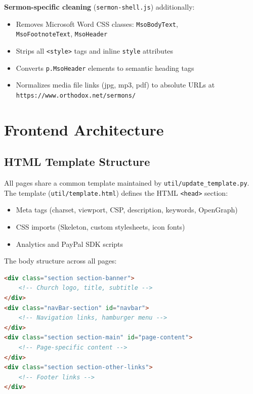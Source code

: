 \documentclass[12pt]{article}
\begin{document}
\textbf{Sermon-specific cleaning} (\texttt{sermon-shell.js}) additionally:
\begin{itemize}
    \item Removes Microsoft Word CSS classes: \texttt{MsoBodyText},\\ \texttt{MsoFootnoteText}, \texttt{MsoHeader}
    \item Strips all \texttt{<style>} tags and inline \texttt{style} attributes
    \item Converts \texttt{p.MsoHeader} elements to semantic heading tags
    \item Normalizes media file links (jpg, mp3, pdf) to absolute URLs at\\ \texttt{https://www.orthodox.net/sermons/}
\end{itemize}

\section{Frontend Architecture}

\subsection{HTML Template Structure}

All pages share a common template maintained by \texttt{util/update\_template.py}. The template (\texttt{util/template.html}) defines the HTML \texttt{<head>} section:

\begin{itemize}
    \item Meta tags (charset, viewport, CSP, description, keywords, OpenGraph)
    \item CSS imports (Skeleton, custom stylesheets, icon fonts)
    \item Analytics and PayPal SDK scripts
\end{itemize}

The body structure across all pages:

\begin{lstlisting}[language=HTML,numbers=none]
<div class="section section-banner">
    <!-- Church logo, title, subtitle -->
</div>
<div class="navBar-section" id="navbar">
    <!-- Navigation links, hamburger menu -->
</div>
<div class="section section-main" id="page-content">
    <!-- Page-specific content -->
</div>
<div class="section section-other-links">
    <!-- Footer links -->
</div>
\end{lstlisting}
\end{document}
